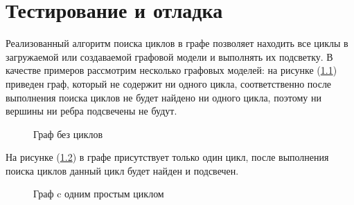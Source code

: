 \chapter{Тестирование и отладка}\label{chap4_soft_testing}

Реализованный алгоритм поиска циклов в графе позволяет находить все циклы в загружаемой или создаваемой графовой модели и выполнять их подсветку. В качестве примеров рассмотрим несколько графовых моделей: на рисунке (\ref{fig:example_no_cycles}) приведен граф, который не содержит ни одного цикла, соответственно после выполнения поиска циклов не будет найдено ни одного цикла, поэтому ни вершины ни ребра подсвечены не будут.

\begin{figure}[ht!]
\caption{Граф без циклов}
\label{fig:example_no_cycles}
\end{figure}

На рисунке (\ref{fig:example_one_cycle}) в графе присутствует только один цикл, после выполнения поиска циклов данный цикл будет найден и подсвечен.

\begin{figure}[ht!]
\caption{Граф c одним простым циклом}
\label{fig:example_one_cycle}
\end{figure}

